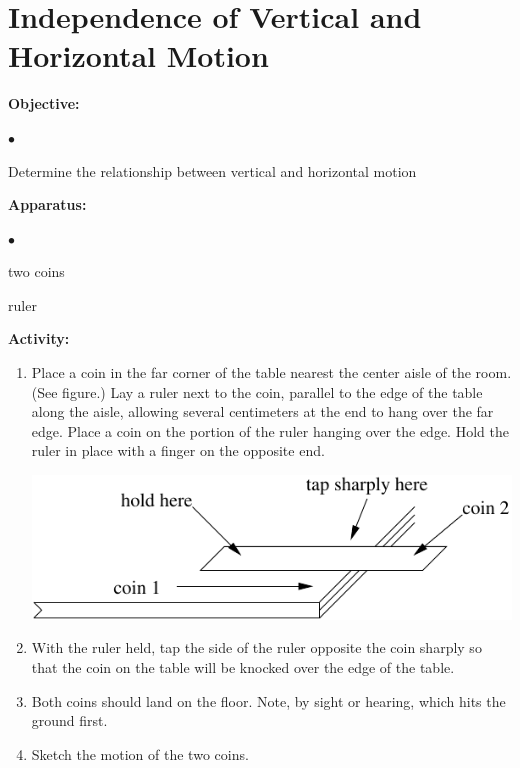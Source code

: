 
\section{Independence of Vertical and Horizontal Motion}

\makelabheader %

{\noindent \bf Objective:} \begin{list}{$\bullet$}{\itemsep0pt }

\item Determine the relationship between vertical and horizontal motion

\end{list}

{\noindent \bf Apparatus:} \begin{list}{$\bullet$}{\itemsep0pt }

\item two coins \item ruler

\end{list}

{\noindent \bf Activity:} \begin{enumerate}

\item Place a coin in the far corner of the table nearest the center aisle of the room. (See figure.) Lay a ruler next to the coin, parallel to the edge of the table along the aisle, allowing several centimeters at the end to hang over the far edge. Place a coin on the portion of the ruler hanging over the edge. Hold the ruler in place with a finger on the opposite end.

\vspace{0.3cm}
{\par\centering \includegraphics{independence/independence_fig1.pdf} \par}
\vspace{0.3cm}

\item With the ruler held, tap the side of the ruler opposite the coin sharply so that the coin on the table will be knocked over the edge of the table.

\item Both coins should land on the floor. Note, by sight or hearing, which hits the ground first.

\item Sketch the motion of the two coins.

\end{enumerate}

